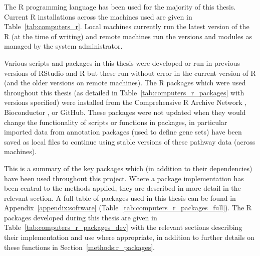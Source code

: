 The R programming language has been used for the majority of this thesis. Current R installations across the machines used are given in Table~\ref{tab:computers_r}. Local machines currently run the latest version of the R (at the time of writing) and remote machines run the versions and modules as managed by the system administrator.

Various scripts and packages in this thesis were developed or run in previous versions of RStudio and R but these run without error in the current version of R (and the older versions on remote machines). The R packages which were used throughout this thesis (as detailed in Table~\ref{tab:computers_r_packages} with versions specified) were installed from the Comprehensive R Archive Network \citep{CRAN}, Bioconductor \citep[][version 3.4; BiocInstaller 1.24.0]{Gentleman2004}, or GitHub. These packages were not updated when they would change the functionality of scripts or functions in packages, in particular imported data from annotation packages (used to define gene sets) have been saved as local files to continue using stable versions of these pathway data (across machines).

This is a summary of the key packages which (in addition to their dependencies) have been used throughout this project. Where a package implementation has been central to the methods applied, they are described in more detail in the relevant section. A full table of packages used in this thesis can be found in Appendix~\ref{appendix:software} (Table~\ref{tab:computers_r_packages_full}). The R packages developed during this thesis are given in Table~\ref{tab:computers_r_packages_dev} with the relevant sections describing their implementation and use where appropriate, in addition to further details on these functions in Section~\ref{methods:r_packages}. 

